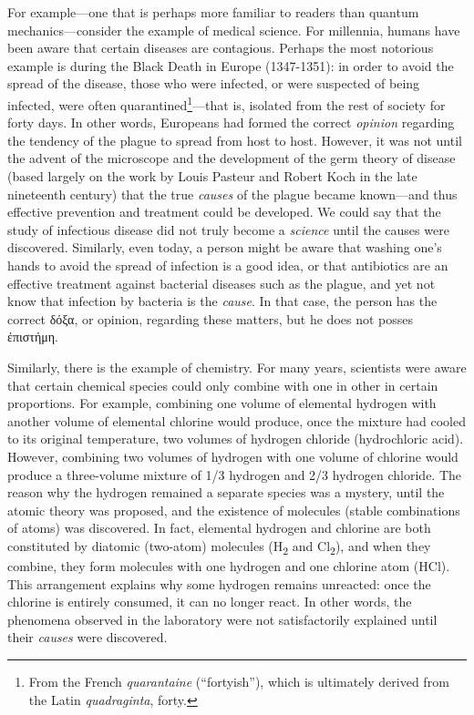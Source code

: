 \documentclass[article,12pt,a4paper,oneside]{memoir}
\begin{document}
    For example---one that is perhaps more familiar to readers than
    quantum mechanics---consider the example of medical science. For
    millennia, humans have been aware that certain diseases are
    contagious. Perhaps the most notorious example is during the Black
    Death in Europe (1347-1351): in order to avoid the spread of the
    disease, those who were infected, or were suspected of being
    infected, were often quarantined\footnote{From the French
      \emph{quarantaine} (``fortyish''), which is ultimately derived
      from the Latin \emph{quadraginta}, forty.}---that is, isolated
    from the rest of society for forty days. In other words, Europeans
    had formed the correct \emph{opinion} regarding the tendency of the
    plague to spread from host to host. However, it was not until the
    advent of the microscope and the development of the germ theory of
    disease (based largely on the work by Louis Pasteur and Robert Koch
    in the late nineteenth century) that the true \emph{causes} of the
    plague became known---and thus effective prevention and treatment
    could be developed. We could say that the study of infectious
    disease did not truly become a \emph{science} until the causes were
    discovered. Similarly, even today, a person might be aware that
    washing one's hands to avoid the spread of infection is a good idea,
    or that antibiotics are an effective treatment against bacterial
    diseases such as the plague, and yet not know that infection by
    bacteria is the \emph{cause}. In that case, the person has the
    correct δόξα, or opinion, regarding these matters, but he does not
    posses ἐπιστήμη.

    Similarly, there is the example of chemistry. For many years,
    scientists were aware that certain chemical species could only
    combine with one in other in certain proportions. For example,
    combining one volume of elemental hydrogen with another volume of
    elemental chlorine would produce, once the mixture had cooled to its
    original temperature, two volumes of hydrogen chloride (hydrochloric
    acid). However, combining two volumes of hydrogen with one volume of
    chlorine would produce a three-volume mixture of 1/3 hydrogen and
    2/3 hydrogen chloride. The reason why the hydrogen remained a
    separate species was a mystery, until the atomic theory was
    proposed, and the existence of molecules (stable combinations of
    atoms) was discovered. In fact, elemental hydrogen and chlorine are
    both constituted by diatomic (two-atom) molecules
    (H\textsubscript{2} and Cl\textsubscript{2}), and when they combine,
    they form molecules with one hydrogen and one chlorine atom (HCl).
    This arrangement explains why some hydrogen remains unreacted: once
    the chlorine is entirely consumed, it can no longer react. In other
    words, the phenomena observed in the laboratory were not
    satisfactorily explained until their \emph{causes} were discovered.
\end{document}
